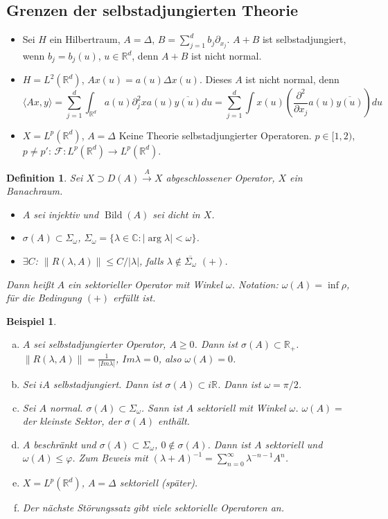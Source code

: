 \documentclass[12pt]{extreport} %
\newtheorem{Definition}[Satz]{Definition}
\newtheorem{Beispiel}[Satz]{Beispiel}
\DeclareMathOperator{\Bild}{Bild}
\numberwithin{equation}{section}
\newcommand{\C}{\mathbb{C}} %
\newcommand{\R}{\mathbb{R}} %
\newcommand{\F}{\mathcal{F}}
\newcommand{\om}{\omega}
\newcommand{\laplace}{\Delta}
\begin{document}
	\subsection*{Grenzen der selbstadjungierten Theorie}
	
	\begin{itemize}
		\item Sei $H$ ein Hilbertraum, $A=\laplace$, $B = \sum_{j = 1}^{d}b_j \partial_{x_j}$. $A+B$ ist selbstadjungiert, wenn $b_j=b_j(u)$, $u\in \R^d$, denn $A+B$ ist nicht normal.
		\item $H = L^2(\R^d)$, $Ax(u) = a(u)\laplace x(u)$. Dieses $A$ ist nicht normal, denn 
		$$\langle Ax, y\rangle = \sum_{j = 1}^{d}\int_{\R^d} a(u)\partial_j^2 xa(u) \overline{y(u)}du = \sum_{j =1}^{d} \int x(u)\left(\frac{\partial^2}{\partial x_j} a(u) \overline{y(u)}\right)du$$
		\item $X= L^p(\R^d)$, $A=\laplace$ Keine Theorie selbstadjungierter Operatoren. $p \in [1,2)$, $p\neq p'$: $\F\colon L^p(\R^d)\rightarrow L^p(\R^d)$.
	\end{itemize}
	
	\begin{Definition}
		Sei $X\supset D(A)\overset{A}{\rightarrow} X$ abgeschlossener Operator, $X$ ein Banachraum. 
		\begin{itemize}
			\item $A$ sei injektiv und $\Bild(A)$ sei dicht in $X$.
			\item $\sigma(A)\subset \Sigma_\om$, $\Sigma_{\om} = \{\lambda\in \C\colon |\arg\lambda|<\om \}$.
			\item $\exists C$: $\|R(\lambda, A)\|\leq C/|\lambda|$, falls $\lambda\notin \overline{\Sigma_\om}$ $(+)$.
		\end{itemize}
		Dann heißt $A$ ein sektorieller Operator mit Winkel $\om$. Notation: $\om(A) = \inf \rho$, für die Bedingung $(+)$ erfüllt ist.
	\end{Definition}
	
	\begin{Beispiel}
		~
		\begin{enumerate}[a)]
			\item $A$ sei selbstadjungierter Operator, $A\geq 0$. Dann ist $\sigma(A)\subset \R_+$. $\|R(\lambda, A)\| = \frac{1}{|Im\lambda|}$, $Im\lambda=0$, also $\om(A) = 0$.
			\item Sei $iA$ selbstadjungiert. Dann ist $\sigma(A)\subset i\R$. Dann ist $\om=\pi/2$.
			\item Sei $A$ normal. $\sigma(A) \subset \Sigma_\omega$. Sann ist $A$ sektoriell mit Winkel $\om$. $\om(A) =$ der kleinste Sektor, der $\sigma(A)$ enthält.
			\item $A$ beschränkt und $\sigma(A)\subset \Sigma_\om$, $0\notin \sigma(A)$. Dann ist $A$ sektoriell und $\om(A) \leq \varphi$. Zum Beweis mit $(\lambda + A)^{-1} = \sum_{n = 0}^{\infty}\lambda^{-n-1}A^n$. 
		    \item $X = L^p(\R^d)$, $A = \laplace$ sektoriell (später).
		    \item Der nächste Störungssatz gibt viele sektorielle Operatoren an.
		\end{enumerate}
	\end{Beispiel}
	
\end{document}
